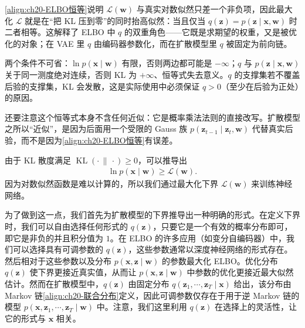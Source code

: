 \documentclass[../../main.tex]{subfiles}
\begin{document}
\begin{remark}
\eqref{align:ch20-ELBO恒等}说明 $\mathcal{L}(\bm{w})$ 与真实对数似然只差一个非负项，因此最大化 $\mathcal{L}$ 就是在“把 KL 压到零”的同时抬高似然：当且仅当 $q(\bm{z})=p(\bm{z}\mid\bm{x},\bm{w})$ 时二者相等。这解释了 ELBO 中 $q$ 的双重角色——它既是求期望的权重，又是被优化的对象；在 VAE 里 $q$ 由编码器参数化，而在扩散模型里 $q$ 被固定为前向链。\par
两个条件不可省：$\ln p(\bm{x}\mid\bm{w})$ 有限，否则两边都可能是 $-\infty$；$q$ 与 $p(\bm{z}\mid\bm{x},\bm{w})$ 关于同一测度绝对连续，否则 KL 为 $+\infty$、恒等式失去意义。$q$ 的支撑集若不覆盖后验的支撑集，KL 会发散，这是实际使用中必须保证 $q>0$（至少在后验为正处）的原因。\par
还要注意这个恒等式本身不含任何近似：它是概率乘法法则的直接改写。扩散模型之所以“近似”，是因为后面用一个受限的 Gauss 族 $p(\bm{z}_{t-1}\mid\bm{z}_t,\bm{w})$ 代替真实后验，而不是因为\eqref{align:ch20-ELBO恒等}有误差。
\end{remark}

由于 KL 散度满足 $\operatorname{KL}(\cdot\,\|\,\cdot)\geqslant 0$，可以推导出
\begin{align}
\ln p(\bm{x}\mid\bm{w})\geqslant\mathcal{L}(\bm{w}).
\label{align:ch20-下界}
\end{align}
因为对数似然函数是难以计算的，所以我们通过最大化下界 $\mathcal{L}(\bm{w})$ 来训练神经网络。

为了做到这一点，我们首先为扩散模型的下界推导出一种明确的形式。在定义下界时，我们可以自由选择任何形式的 $q(\bm{z})$，只要它是一个有效的概率分布即可，即它是非负的并且积分值为 $1$。在 ELBO 的许多应用（如变分自编码器）中，我们可以选择具有可调参数的 $q(\bm{z})$，这些参数通常以深度神经网络的形式存在。然后相对于这些参数以及分布 $p(\bm{x},\bm{z}\mid\bm{w})$ 的参数最大化 ELBO。优化分布 $q(\bm{z})$ 使下界更接近真实值，从而让 $p(\bm{x},\bm{z}\mid\bm{w})$ 中参数的优化更接近最大似然估计。然而在扩散模型中，$q(\bm{z})$ 由固定分布 $q(\bm{z}_1,\cdots,\bm{z}_T\mid\bm{x})$ 给出，该分布由 Markov 链\eqref{align:ch20-联合分布}定义，因此可调参数仅存在于用于逆 Markov 链的模型 $p(\bm{x},\bm{z}_1,\cdots,\bm{z}_T\mid\bm{w})$ 中。注意，我们这里利用 $q(\bm{z})$ 在选择上的灵活性，让它的形式与 $\bm{x}$ 相关。
\end{document}
